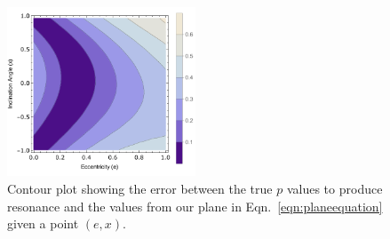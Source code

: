 \begin{figure}
    \centering
    \includegraphics[width=0.5\textwidth]{images/planeErr.pdf}
    \caption[Contour plot of estimation error]{Contour plot showing the error between the true $p$ values to produce resonance and the values from our plane in Eqn.~\eqref{eqn:planeequation} given a point $(e,x)$.}
    \label{fig:planeErr}
\end{figure}